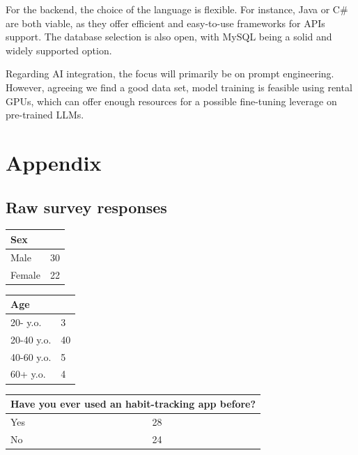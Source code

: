 \documentclass{article}
\begin{document}
For the backend, the choice of the language is flexible. For instance, Java or C\# are both viable, as they offer efficient and easy-to-use frameworks for APIs support.
The database selection is also open, with MySQL being a solid and widely supported option.

Regarding AI integration, the focus will primarily be on prompt engineering.
However, agreeing we find a good data set, model training is feasible using rental GPUs, which can offer enough resources for a possible fine-tuning leverage on pre-trained LLMs.

\newpage
\section{Appendix}

\subsection{Raw survey responses}
\label{subsec:survey-responses}

\begin{table}[H]
    \centering
    \begin{tabularx}{0.9\textwidth}{X|p{1in}}
        \hline
        \multicolumn{2}{l}{\textbf{Sex}} \\
        \hline
        Male & 30 \\
        \hline
        Female & 22 \\
        \hline
    \end{tabularx}
\end{table}

\begin{table}[H]
    \centering
    \begin{tabularx}{0.9\textwidth}{X|p{1in}}
        \hline
        \multicolumn{2}{l}{\textbf{Age}} \\
        \hline
        20- y.o. & 3 \\
        \hline
        20-40 y.o. & 40 \\
        \hline
        40-60 y.o. & 5 \\
        \hline
        60+ y.o. & 4 \\
        \hline
    \end{tabularx}
\end{table}

\begin{table}[H]
    \centering
    \begin{tabularx}{0.9\textwidth}{X|p{1in}}
        \hline
        \multicolumn{2}{l}{\textbf{Have you ever used an habit-tracking app before?}} \\
        \hline
        Yes & 28 \\
        \hline
        No & 24 \\
        \hline
    \end{tabularx}
\end{table}
\end{document}
